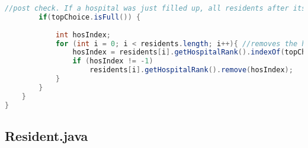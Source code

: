 \documentclass[letterpaper, 10pt,DIV=13]{scrartcl}
\numberwithin{equation}{section} %
\numberwithin{figure}{section} %
\numberwithin{table}{section} %
\begin{document}
\begin{lstlisting}[frame=single, language=java, breaklines]
        //post check. If a hospital was just filled up, all residents after its last ranked resident being considered are dropped from the running.
        if(topChoice.isFull()) {
            
            int hosIndex;
            for (int i = 0; i < residents.length; i++){ //removes the hospital from all of the residents that have it ranked
                hosIndex = residents[i].getHospitalRank().indexOf(topChoice);
                if (hosIndex != -1)
                    residents[i].getHospitalRank().remove(hosIndex);
            }
        }
    }
}
\end{lstlisting}

\subsection{Resident.java}
\end{document}
